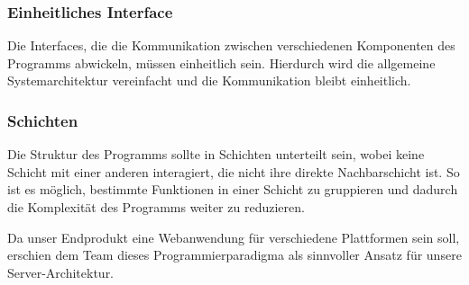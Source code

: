 \subsubsection{Einheitliches Interface}
Die Interfaces, die die Kommunikation zwischen verschiedenen Komponenten des Programms abwickeln, müssen einheitlich sein. Hierdurch wird die allgemeine Systemarchitektur vereinfacht und die Kommunikation bleibt einheitlich.

\subsubsection{Schichten}
Die Struktur des Programms sollte in Schichten unterteilt sein, wobei keine Schicht mit einer anderen interagiert, die nicht ihre direkte Nachbarschicht ist. So ist es möglich, bestimmte Funktionen in einer Schicht zu gruppieren und dadurch die Komplexität des Programms weiter zu reduzieren.

Da unser Endprodukt eine Webanwendung für verschiedene Plattformen sein soll, erschien dem Team dieses Programmierparadigma als sinnvoller Ansatz für unsere Server-Architektur.

